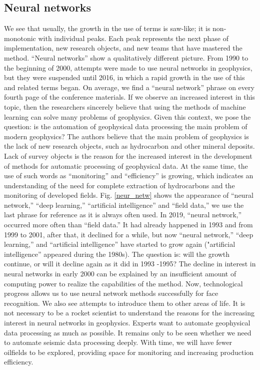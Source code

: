 \documentclass[geosciences,article,submit,moreauthors,pdftex]{Definitions/mdpi}
\begin{document}
\subsection{Neural networks} 
We see that usually, the growth in the use of terms is saw-like; it is non-monotonic with individual peaks. Each peak represents the next phase of implementation, new research objects, and new teams that have mastered the method. ``Neural networks'' show a qualitatively different picture. From 1990 to the beginning of 2000, attempts were made to use neural networks in geophysics, but they were suspended until 2016, in which a rapid growth in the use of this and related terms began. On average, we find a ``neural network'' phrase on every fourth page of the conference materials. If we observe an increased interest in this topic, then the researchers sincerely believe that using the methods of machine learning can solve many problems of geophysics. Given this context, we pose the question: is the automation of geophysical data processing the main problem of modern geophysics? The authors believe that the main problem of geophysics is the lack of new research objects, such as hydrocarbon and other mineral deposits. Lack of survey objects is the reason for the increased interest in the development of methods for automatic processing of geophysical data. At the same time, the use of such words as ``monitoring'' and ``efficiency'' is growing, which indicates an understanding of the need for complete extraction of hydrocarbons and the monitoring of developed fields. Fig. \ref{neur_netw} shows the appearance of ``neural network,'' ``deep learning,'' ``artificial intelligence'' and ``field data,'' we use the last phrase for reference as it is always often used. In 2019, ``neural network,'' occurred more often than ``field data.'' It had already happened in 1993 and from 1999 to 2001, after that, it declined for a while, but now ``neural network,'' ``deep learning,'' and ``artificial intelligence'' have started to grow again ("artificial intelligence'' appeared during the 1980s). The question is: will the growth continue, or will it decline again as it did in 1993 -1995? The decline in interest in neural networks in early 2000 can be explained by an insufficient amount of computing power to realize the capabilities of the method. Now, technological progress allows us to use neural network methods successfully for face recognition. We also see attempts to introduce them to other areas of life. It is not necessary to be a rocket scientist to understand the reasons for the increasing interest in neural networks in geophysics. Experts want to automate geophysical data processing as much as possible. It remains only to be seen whether we need to automate seismic data processing deeply. With time, we will have fewer oilfields to be explored, providing space for monitoring and increasing production efficiency.
\end{document}
